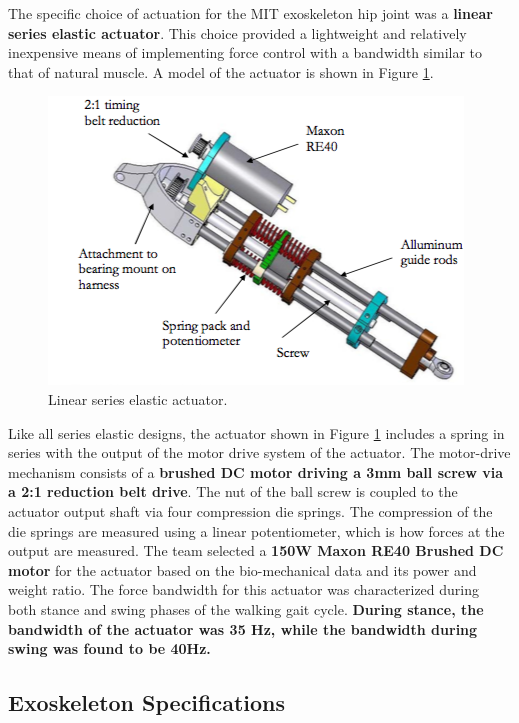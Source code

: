 \begin{refsection}
The specific choice of actuation for the MIT exoskeleton hip joint was a {\bf linear series elastic actuator}.  This choice provided a lightweight and relatively inexpensive means of implementing force control with a bandwidth similar to that of natural muscle.  A model of the actuator is shown in Figure \ref{fig:mitSEA}.
\begin{figure}[thpb]
\centering
\includegraphics[width=3.in]{exos/figs/MIT/mitSEA}
  \caption{Linear series elastic actuator.}
 \label{fig:mitSEA}   
 \end{figure} 
Like all series elastic designs, the actuator shown in Figure \ref{fig:mitSEA} includes a spring in series with the output of the motor drive system of the actuator.  The motor-drive mechanism consists of a {\bf brushed DC motor driving a 3mm ball screw via a 2:1 reduction belt drive}.  The nut of the ball screw is coupled to the actuator output shaft via four compression die springs.  The compression of the die springs are measured using a linear potentiometer, which is how forces at the output are measured.
The team selected a {\bf 150W Maxon RE40 Brushed DC motor} for the actuator  based on the bio-mechanical data and its power and weight ratio. The force bandwidth for this actuator was characterized during both stance and swing phases of the walking gait cycle.  {\bf During stance, the bandwidth of the actuator was 35 Hz, while the bandwidth during swing was found to be 40Hz.} 
 
 \subsection{Exoskeleton Specifications}
 

\end{refsection}
